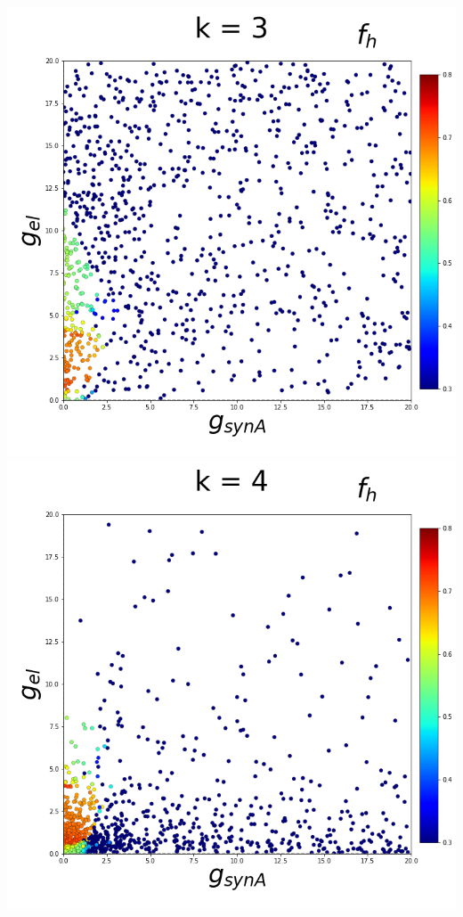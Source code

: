 \documentclass[11pt]{article}
\begin{document}
\begin{center}
\includegraphics[scale=0.125]{DSN_figs/STGCircuit_DSN_c=0_rs=4_k=3.png}
\includegraphics[scale=0.125]{DSN_figs/STGCircuit_DSN_c=0_rs=4_k=4.png}

\end{center}
\end{document}
